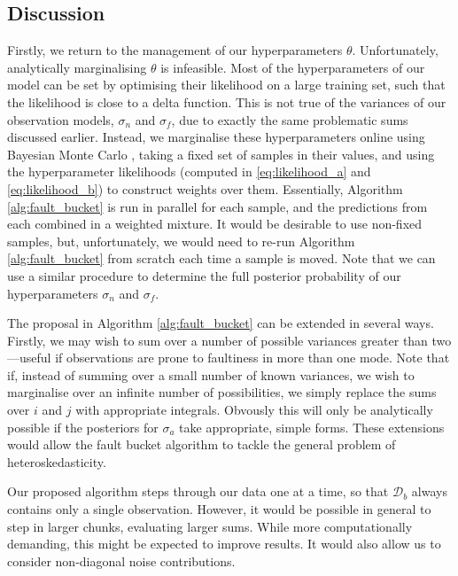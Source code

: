 \documentclass{article}
\newcommand{\cm}[1]{\ensuremath{\mathcal{#1}}}
\newcommand{\data}{\ensuremath{\cm{D}}}
\begin{document}
\subsection{Discussion}

Firstly, we return to the management of our hyperparameters $\theta$. Unfortunately, analytically marginalising $\theta$ is infeasible. Most of the hyperparameters of our model can be set by optimising their likelihood on a large training set, such that the likelihood is close to a delta function. This is not true of the variances of our observation models, $\sigma_n$ and $\sigma_f$, due to exactly the same problematic sums discussed earlier. Instead, we marginalise these hyperparameters online using Bayesian Monte Carlo \citep[Chapter 7]{osbornebayesian}, taking a fixed set of samples in their values, and using the hyperparameter likelihoods (computed in \eqref{eq:likelihood_a} and \eqref{eq:likelihood_b}) to construct weights over them. Essentially, Algorithm \ref{alg:fault_bucket} is run in parallel for each sample, and the predictions from each combined in a weighted mixture.
It would be desirable to use non-fixed samples, but, unfortunately, we would need to re-run Algorithm \ref{alg:fault_bucket} from scratch each time a sample is moved. Note that we can use a similar procedure \cite{garnettosborne} to determine the full posterior probability of our hyperparameters $\sigma_n$ and $\sigma_f$.

The proposal in Algorithm \ref{alg:fault_bucket} can be extended in several ways. Firstly, we may wish to sum over a number of possible variances greater than two---useful if observations are prone to faultiness in more than one mode. 
Note that if, instead of summing over a small number of known variances, we wish to marginalise over an infinite number of possibilities, we simply replace the sums over $i$ and $j$ with appropriate integrals. Obvously this will only be analytically possible if the posteriors for $\sigma_a$ take appropriate, simple forms. 
These extensions would allow the fault bucket algorithm to tackle the general problem of heteroskedasticity.

Our proposed algorithm steps through our data one at a time, so that $\data_b$ always contains only a single observation. However, it would be possible in general to step in larger chunks, evaluating larger sums. While more computationally demanding, this might be expected to improve results. It would also allow us to consider non-diagonal noise contributions.
\end{document}
